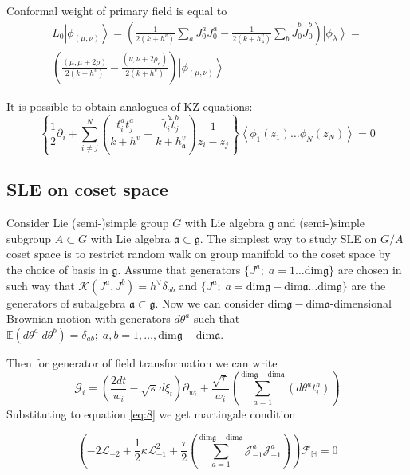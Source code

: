 \documentclass[12pt]{article}
\theoremstyle{definition}
\newcommand{\gf}{\mathfrak{g}}
\newcommand{\af}{\mathfrak{a}}
\theoremstyle{definition} \newtheorem{Def}{Definition}
\begin{document}
Conformal weight of primary field is equal to
\begin{multline}
  L_0\left|\phi_{(\mu,\nu)}\right>=\left(\frac{1}{2(k+h^v)}\sum_aJ^a_0J^a_0-\frac{1}{2(k+h_{\af}^v)}\sum_b \tilde{J}^b_0 \tilde{J}^b_0 \right)
  \left|\phi_{\lambda}\right>=\\
  \left(\frac{(\mu,\mu+2\rho)}{2(k+h^v)}-\frac{(\nu,\nu+2\rho_{\af})}{2(k+h^v)}\right)\left|\phi_{(\mu,\nu)}\right>
\end{multline}


It is possible to obtain analogues of KZ-equations:
\begin{equation*}
  \left\{\frac{1}{2}\partial_{i} + \sum_{i\neq j}^{N}\left(\frac{t^{a}_{i}t^{a}_{j}}{k+h^{v}}-\frac{\tilde t^{b}_{i}\tilde t^{b}_{j}}{k+h^{v}_{\af}}\right)\frac{1}{z_{i}-z_{j}}\right\} \left<\phi_{1}(z_{1})\dots \phi_{N}(z_{N})\right>=0
\end{equation*}

\subsection{SLE on coset space}
Consider Lie (semi-)simple group $G$ with Lie algebra $\gf$ and (semi-)simple subgroup $A\subset G$ with Lie algebra $\af\subset \gf$. 
The simplest way to study SLE on $G/A$ coset space is to restrict random walk on group manifold to the coset space by the choice of basis in $\gf$. Assume that generators $\{J^{a};\; a=1\dots \mathrm{dim}\gf\}$ are chosen in such way that $\mathcal{K}(J^{a},J^{b})=h^{\vee}\delta_{ab}$ and $\{J^{a};\; a=\mathrm{dim}\gf-\mathrm{dim}\af\dots \mathrm{dim}\gf\}$ are the generators of subalgebra $\af\subset \gf$. Now we can consider $\mathrm{dim}\gf-\mathrm{dim}\af$-dimensional Brownian motion with generators $d\theta^{a}$ such that $\mathbb{E}(d\theta^{a} \; d\theta^{b})=\delta_{ab};\; a,b=1,\dots,\mathrm{dim}\gf-\mathrm{dim}\af$.

Then for generator of field transformation we can write 
\begin{equation}
  \mathcal{G}_{i}=\left(\frac{2dt}{w_{i}}-\sqrt{\kappa} d\xi_{t}\right) \partial_{w_{i}}+\frac{\sqrt{\tau}}{w_{i}}\left(\sum_{a=1}^{\mathrm{dim}\gf-\mathrm{dim}\af}\left(d \theta ^{a} t^{a}_{i}\right)\right)
\label{eq:5}
\end{equation}
Substituting to equation \eqref{eq:8} we get martingale condition

\begin{equation}
  \left(-2 \mathcal{L}_{-2}+\frac{1}{2}\kappa \mathcal{L}_{-1}^{2}+\frac{\tau}{2}\left( \sum_{a=1}^{\mathrm{dim}\gf-\mathrm{dim}\af} \mathcal{J}^{a}_{-1} \mathcal{J}^{a}_{-1}\right)\right)        \mathcal{F}_{\mathbb{H}}=0
\label{eq:9}
\end{equation}
\end{document}
